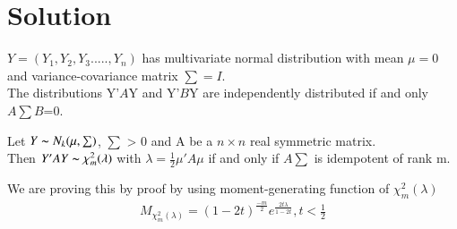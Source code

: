 \documentclass[journal,12pt,twocolumn]{IEEEtran}
\begin{document}
\section*{Solution}
\begin{lemma}
 $Y=(Y_1,Y_2,Y_3.....,Y_n)$ has multivariate normal distribution with mean $\mu=0$ and variance-covariance matrix $\sum=I$.\\
The distributions Y'$A$Y and  Y'$B$Y  are independently distributed if and only  $A\sum B$=0.\\
 \end{lemma}
\begin{lemma}
Let ${Y \thicksim N_k(\mu, \sum)}$,  $\sum$ > 0 and A be a  $n\times n$ real symmetric matrix.\\
Then $Y'AY \thicksim \chi^2_m(\lambda)$  with  $\lambda=\frac{1}{2}\mu'A\mu$ if and only if $A\sum$ is idempotent of rank m.\\
\end{lemma}
We are proving this by proof by using moment-generating function of $\chi^2_m(\lambda)$
\begin{align}
    M_{\chi_m^2(\lambda)}=(1-2t)^{\frac{-m}{2}}e^{\frac{2t\lambda}{1-2t}}, t< \frac{1}{2}
\end{align}
\end{document}
